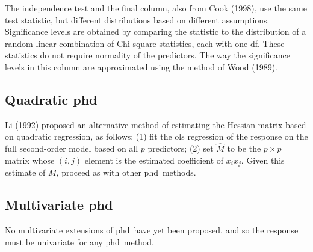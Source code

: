 \documentclass{article}
\newcommand{\phd}{{\sffamily phd}}
\begin{document}
The independence test and the final column, also from Cook
(1998), use the same test statistic, but different distributions based on
different assumptions.
Significance levels are obtained by comparing the statistic to the
distribution of a random linear combination of Chi-square statistics, each
with one df.  These statistics do not require normality
of the predictors.  The way the significance levels
in this column are approximated using the method of Wood (1989).

\subsection{Quadratic \phd}
Li (1992) proposed an alternative method of estimating the Hessian matrix
based on quadratic regression, as follows:  (1) fit the ols regression of
the response on the full second-order model based on all $p$ predictors; (2)
set $\hat{M}$ to be the $p \times p$ matrix whose $(i,j)$ element is the
estimated coefficient of $x_ix_j$.  Given this estimate of $M$, proceed as
with other \phd\ methods.

\subsection{Multivariate \phd}
No multivariate extensions of \phd\ have yet been proposed, and so the
response must be univariate for any \phd\ method.
\end{document}
